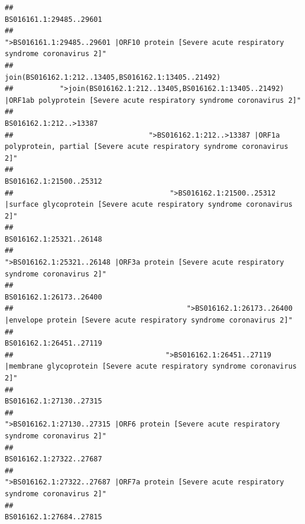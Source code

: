 \documentclass[
]{article}
\begin{document}
\begin{verbatim}
##                                                                                                                BS016161.1:29485..29601 
##                                            ">BS016161.1:29485..29601 |ORF10 protein [Severe acute respiratory syndrome coronavirus 2]" 
##                                                                                    join(BS016162.1:212..13405,BS016162.1:13405..21492) 
##           ">join(BS016162.1:212..13405,BS016162.1:13405..21492) |ORF1ab polyprotein [Severe acute respiratory syndrome coronavirus 2]" 
##                                                                                                                 BS016162.1:212..>13387 
##                                ">BS016162.1:212..>13387 |ORF1a polyprotein, partial [Severe acute respiratory syndrome coronavirus 2]" 
##                                                                                                                BS016162.1:21500..25312 
##                                     ">BS016162.1:21500..25312 |surface glycoprotein [Severe acute respiratory syndrome coronavirus 2]" 
##                                                                                                                BS016162.1:25321..26148 
##                                            ">BS016162.1:25321..26148 |ORF3a protein [Severe acute respiratory syndrome coronavirus 2]" 
##                                                                                                                BS016162.1:26173..26400 
##                                         ">BS016162.1:26173..26400 |envelope protein [Severe acute respiratory syndrome coronavirus 2]" 
##                                                                                                                BS016162.1:26451..27119 
##                                    ">BS016162.1:26451..27119 |membrane glycoprotein [Severe acute respiratory syndrome coronavirus 2]" 
##                                                                                                                BS016162.1:27130..27315 
##                                             ">BS016162.1:27130..27315 |ORF6 protein [Severe acute respiratory syndrome coronavirus 2]" 
##                                                                                                                BS016162.1:27322..27687 
##                                            ">BS016162.1:27322..27687 |ORF7a protein [Severe acute respiratory syndrome coronavirus 2]" 
##                                                                                                                BS016162.1:27684..27815 

\end{verbatim}
\end{document}
